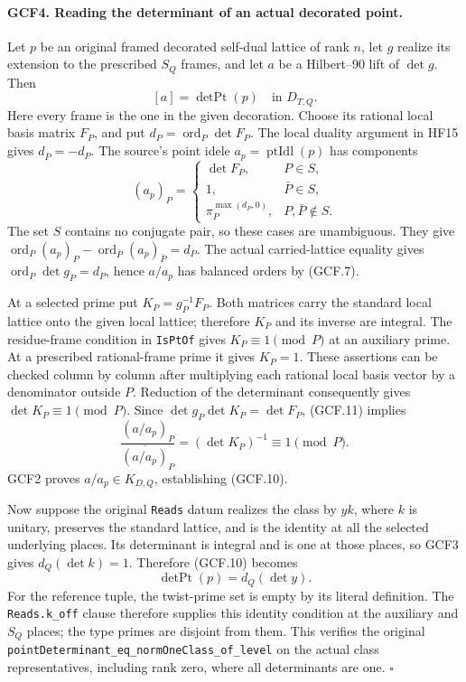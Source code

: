 \paragraph{GCF4. Reading the determinant of an actual decorated point.}
\label{claim:GCF4}
Let \(p\) be an original framed decorated self-dual lattice of rank
\(n\), let \(g\) realize its extension to the prescribed \(S_Q\)
frames, and let \(a\) be a Hilbert--90 lift of \(\det g\).  Then
\[
                         [a]=\operatorname{detPt}(p)
                                       \quad\text{in }D_{T,Q}.
 \tag{GCF.10}
\]
Here every frame is the one in the given decoration.  Choose its
rational local basis matrix \(F_P\), and put
\(d_P=\operatorname{ord}_P\det F_P\).  The local duality argument
in HF15 gives \(d_{\bar P}=-d_P\).  The source's point idele
\(a_p=\operatorname{ptIdl}(p)\) has components
\[
 (a_p)_P=
 \begin{cases}
    \det F_P,&P\in S,\\
    1,&\bar P\in S,\\
    \pi_P^{\max(d_P,0)},&P,\bar P\notin S.
 \end{cases}                                                   \tag{GCF.11}
\]
The set \(S\) contains no conjugate pair, so these cases are
unambiguous.  They give
\(\operatorname{ord}_P(a_p)_P-
\operatorname{ord}_{\bar P}(a_p)_{\bar P}=d_P\).
The actual carried-lattice equality gives
\(\operatorname{ord}_P\det g_P=d_P\), hence \(a/a_p\) has
balanced orders by (GCF.7).

At a selected prime put \(K_P=g_P^{-1}F_P\).  Both matrices carry
the standard local lattice onto the given local lattice; therefore
\(K_P\) and its inverse are integral.  The residue-frame condition
in \texttt{IsPtOf} gives \(K_P\equiv1\pmod P\) at an auxiliary
prime.  At a prescribed rational-frame prime it gives \(K_P=1\).
These assertions can be checked column by column after multiplying
each rational local basis vector by a denominator outside \(P\).
Reduction of the determinant consequently gives
\(\det K_P\equiv1\pmod P\).  Since
\(\det g_P\det K_P=\det F_P\), (GCF.11) implies
\[
 \frac{(a/a_p)_P}{\overline{(a/a_p)}_P}
                 =(\det K_P)^{-1}\equiv1\pmod P.
\]
GCF2 proves \(a/a_p\in K_{D,Q}\), establishing (GCF.10).

Now suppose the original \texttt{Reads} datum realizes the class
by \(y k\), where \(k\) is unitary, preserves the standard lattice,
and is the identity at all the selected underlying places.  Its
determinant is integral and is one at those places, so GCF3 gives
\(d_Q(\det k)=1\).  Therefore (GCF.10) becomes
\[
                \operatorname{detPt}(p)=d_Q(\det y).
 \tag{GCF.12}
\]
For the reference tuple, the twist-prime set is empty by its literal
definition.  The \texttt{Reads.k\_off} clause therefore supplies this
identity condition at the auxiliary and \(S_Q\) places; the type
primes are disjoint from them.  This verifies the original
\texttt{pointDeterminant\_eq\_}\allowbreak\texttt{normOneClass\_of\_level} on the actual
class representatives, including rank zero, where all determinants
are one.
\hfill\(\square\)

